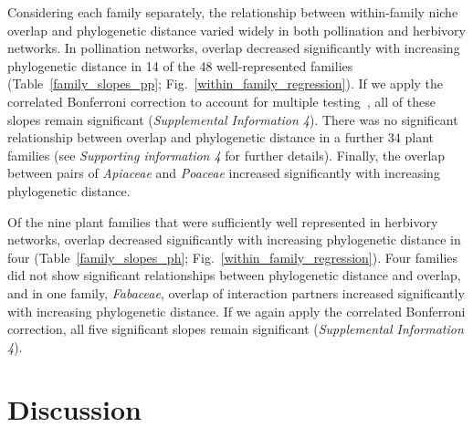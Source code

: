 \documentclass[12pt]{article}
\begin{document}
\begin{spacing}{1.5}
    Considering each family separately, the relationship between within-family niche overlap and phylogenetic distance varied widely in both pollination and herbivory networks. 
    In pollination networks, overlap decreased significantly with increasing phylogenetic distance in 14 of the 48 well-represented families (Table~\ref{family_slopes_pp}; Fig.~\ref{within_family_regression}). If we apply the correlated Bonferroni correction to account for multiple testing~\citep{Drezner2016}, all of these slopes remain significant (\emph{Supplemental Information 4}).
    There was no significant relationship between overlap and phylogenetic distance in
    a further 34 plant families (see \emph{Supporting information 4} for further 
    details). Finally, the overlap between pairs of \emph{Apiaceae} and \emph{Poaceae} increased significantly with increasing phylogenetic distance.


    Of the nine plant families that were sufficiently well represented in herbivory 
    networks, overlap decreased significantly with increasing phylogenetic distance in four 
    (Table~\ref{family_slopes_ph}; Fig.~\ref{within_family_regression}). Four
    families did not show significant relationships between phylogenetic distance and overlap,
    and in one family, \emph{Fabaceae}, overlap of interaction partners increased significantly with 
    increasing phylogenetic distance. If we again apply the correlated Bonferroni correction, all five significant slopes remain significant  (\emph{Supplemental Information 4}).

\clearpage

\section*{Discussion} 



\end{spacing}
\end{document}

